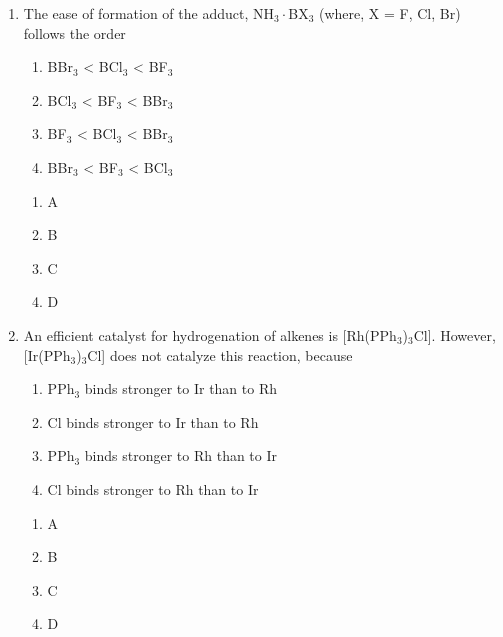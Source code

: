 \documentclass[journal,12pt,onecolumn]{exam}
\theoremstyle{remark}
\newcommand{\correct}{\textcolor{correctgreen}{\checkmark}}
\newcommand{\wrong}{\textcolor{wrongred}{\ding{55}}} %
\begin{document}
\begin{enumerate}
 

\item
The ease of formation of the adduct, NH$_3\cdot$BX$_3$ (where, X = F, Cl, Br) follows the order

\begin{enumerate}
    \item BBr$_3$ < BCl$_3$ < BF$_3$
    \item BCl$_3$ < BF$_3$ < BBr$_3$
    \item BF$_3$ < BCl$_3$ < BBr$_3$
    \item BBr$_3$ < BF$_3$ < BCl$_3$
\end{enumerate}

\hfill{}

 

\begin{multicols}{2}
\begin{enumerate}
    \item \wrong A
    \item \wrong B
    \item \correct C
    \item \wrong D
\end{enumerate}
\end{multicols}

 

\item
An efficient catalyst for hydrogenation of alkenes is [Rh(PPh$_3$)$_3$Cl]. However, [Ir(PPh$_3$)$_3$Cl] does not catalyze this reaction, because

\begin{enumerate}
    \item PPh$_3$ binds stronger to Ir than to Rh
    \item Cl binds stronger to Ir than to Rh
    \item PPh$_3$ binds stronger to Rh than to Ir
    \item Cl binds stronger to Rh than to Ir
\end{enumerate}

\hfill{}

 

\begin{multicols}{2}
\begin{enumerate}
    \item \correct A
    \item \wrong B
    \item \wrong C
    \item \wrong D
\end{enumerate}
\end{multicols}


\end{enumerate}
\end{document}

